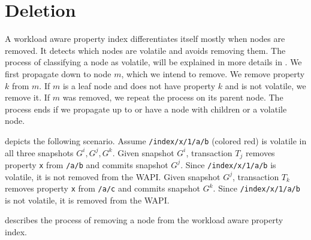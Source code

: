 \documentclass[abstracton,12pt]{scrreprt}
\begin{document}
\section{Deletion}

A workload aware property index differentiates itself mostly when nodes are removed.
It detects which nodes are volatile and avoids removing them.
The process of classifying a node as volatile, will be explained in more details in .
We first propagate down to node $m$, which we intend to remove.
We remove property $k$ from $m$.
If $m$ is a leaf node and does not have property $k$ and is not volatile, we remove it.
If $m$ was removed, we repeat the process on its parent node.
The process ends if we propagate up to \texttt{\index} or have a node with children or a volatile node.

 depicts the following scenario.
Assume \texttt{/index/x/1/a/b} (colored red) is volatile in all three snapshots $G^i, G^j, G^k$.
Given snapshot $G^i$, transaction $T_j$ removes property \texttt{x} from \texttt{/a/b} and commits snapshot $G^j$.
Since \texttt{/index/x/1/a/b} is volatile, it is not removed from the WAPI.
Given snapshot $G^j$, transaction $T_k$ removes property \texttt{x} from \texttt{/a/c} and commits snapshot $G^k$.
Since \texttt{/index/x/1/a/b} is not volatile, it is removed from the WAPI.

 describes the process of removing a node from the workload aware property index.
\end{document}
